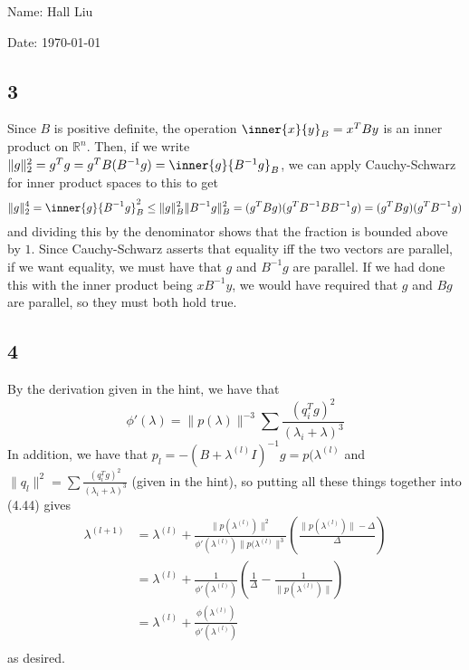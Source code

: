 \documentclass{article}
\newcommand{\rn}{\mathbb{R}}
\begin{document}
Name: Hall Liu

Date: \today 
\vspace{1.5cm}

\subsection*{3}
Since $B$ is positive definite, the operation $\inner{x}{y}_B=x^TBy$ is an inner product on $\rn^n$. Then, if we write $\|g\|^2_2=g^Tg=g^TB(B^{-1}g)=\inner{g}{B^{-1}g}_B$, we can apply Cauchy-Schwarz for inner product spaces to this to get 
\[\|g\|_2^4=\inner{g}{B^{-1}g}_B^2\leq\|g\|_B^2\|B^{-1}g\|_B^2=(g^TBg)(g^TB^{-1}BB^{-1}g)=(g^TBg)(g^TB^{-1}g)\]
and dividing this by the denominator shows that the fraction is bounded above by $1$. Since Cauchy-Schwarz asserts that equality iff the two vectors are parallel, if we want equality, we must have that $g$ and $B^{-1}g$ are parallel. If we had done this with the inner product being $xB^{-1}y$, we would have required that $g$ and $Bg$ are parallel, so they must both hold true.
\subsection*{4}
By the derivation given in the hint, we have that 
\[\phi'(\lambda)=\|p(\lambda)\|^{-3}\sum\frac{(q_i^Tg)^2}{(\lambda_i+\lambda)^3}\]
In addition, we have that $p_l=-(B+\lambda^{(l)}I)^{-1}g=p(\lambda^{(l)}$ and $\|q_l\|^2=\sum\frac{(q_i^Tg)^2}{(\lambda_i+\lambda)^3}$ (given in the hint), so putting all these things together into (4.44) gives
\begin{align*}
    \lambda^{(l+1)}&=\lambda^{(l)}+\frac{\|p(\lambda^{(l)})\|^2}{\phi'(\lambda^{(l)})\|p(\lambda^{(l)}\|^3}\left(\frac{\|p(\lambda^{(l)})\|-\Delta}{\Delta}\right)\\
                   &=\lambda^{(l)}+\frac{1}{\phi'(\lambda^{(l)})}\left(\frac{1}{\Delta}-\frac{1}{\|p(\lambda^{(l)})\|}\right)\\
                   &=\lambda^{(l)}+\frac{\phi(\lambda^{(l)})}{\phi'(\lambda^{(l)})}\\
\end{align*}
as desired.
\end{document}
